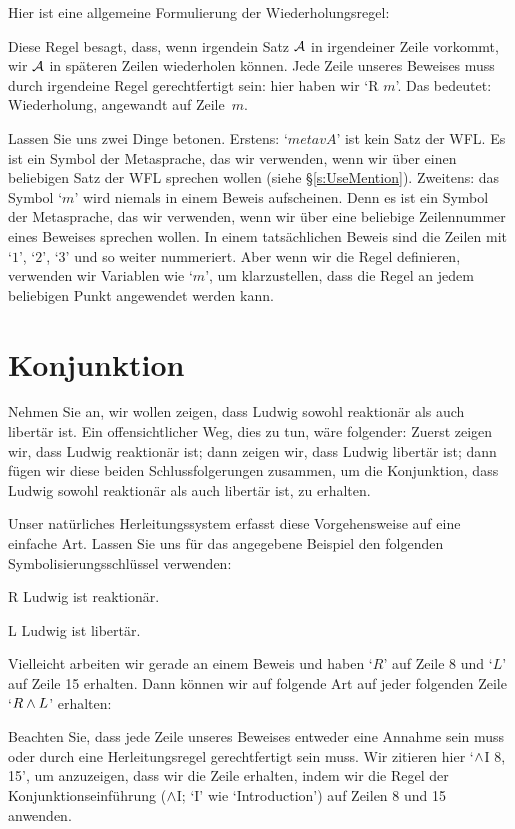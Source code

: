 Hier ist eine allgemeine Formulierung der Wiederholungsregel:
\begin{fitchproof}
	 
\end{fitchproof}
Diese Regel besagt, dass, wenn irgendein Satz $\mathcal{A}$ in irgendeiner Zeile vorkommt, wir $\mathcal{A}$ in späteren Zeilen wiederholen können. Jede Zeile unseres Beweises muss durch irgendeine Regel gerechtfertigt sein: hier haben wir `R $m$'. Das bedeutet: Wiederholung, angewandt auf Zeile~$m$. 

Lassen Sie uns zwei Dinge betonen. Erstens: `$metav{A}$' ist kein Satz der WFL. Es ist ein Symbol der Metasprache, das wir verwenden, wenn wir über einen beliebigen Satz der WFL sprechen wollen (siehe \S\ref{s:UseMention}). Zweitens: das Symbol `$m$' wird niemals in einem Beweis aufscheinen. Denn es ist ein Symbol der Metasprache, das wir verwenden, wenn wir über eine beliebige Zeilennummer eines Beweises sprechen wollen. In einem tatsächlichen Beweis sind die Zeilen mit `$1$', `$2$', `$3$' und so weiter nummeriert. Aber wenn wir die Regel definieren, verwenden wir Variablen wie `$m$', um klarzustellen, dass die Regel an jedem beliebigen Punkt angewendet werden kann.

\section{Konjunktion}
Nehmen Sie an, wir wollen zeigen, dass Ludwig sowohl reaktionär als auch libertär ist. Ein offensichtlicher Weg, dies zu tun, wäre folgender: Zuerst zeigen wir, dass Ludwig reaktionär ist; dann zeigen wir, dass Ludwig libertär ist; dann fügen wir diese beiden Schlussfolgerungen zusammen, um die Konjunktion, dass Ludwig sowohl reaktionär als auch libertär ist, zu erhalten.

Unser natürliches Herleitungssystem erfasst diese Vorgehensweise auf eine einfache Art. Lassen Sie uns für das angegebene Beispiel den folgenden Symbolisierungsschlüssel verwenden:
	\begin{ekey}
		\item[R] Ludwig ist reaktionär.
		\item[L] Ludwig ist libertär.
	\end{ekey}
Vielleicht arbeiten wir gerade an einem Beweis und haben `$R$' auf Zeile 8 und `$L$' auf Zeile 15 erhalten. Dann können wir auf folgende Art auf jeder folgenden Zeile `$R \wedge L$' erhalten:
\begin{fitchproof}
	 
\end{fitchproof}
Beachten Sie, dass jede Zeile unseres Beweises entweder eine Annahme sein muss oder durch eine Herleitungsregel gerechtfertigt sein muss. Wir zitieren hier `$\wedge$I 8, 15', um anzuzeigen, dass wir die Zeile erhalten, indem wir die Regel der Konjunktionseinführung ($\wedge$I; `I' wie `Introduction') auf Zeilen 8 und 15 anwenden. 


